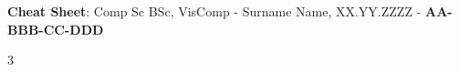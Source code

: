 \documentclass[10pt,landscape, margin = 0.1mm]{article}
\begin{document}
\syntaxonlys

\begin{center}
     \Large{\textbf{Cheat Sheet}: Comp Sc BSc, VisComp - Surname Name, XX.YY.ZZZZ - \textbf{AA-BBB-CC-DDD}} \\
\end{center}
\begin{multicols}{3}
\setlength{\premulticols}{0.5pt}
\setlength{\postmulticols}{0.5pt}
\setlength{\multicolsep}{0.5pt}
\setlength{\columnsep}{0.2pt}
\setlength{\columnseprule}{0pt}



\begin{flushleft}






\end{flushleft}
\end{multicols}
\end{document}
